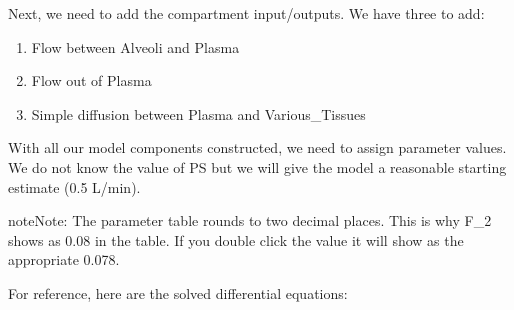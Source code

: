\documentclass[letterpaper,10pt,english]{sphinxmanual}
\begin{document}
\sphinxAtStartPar
Next, we need to add the compartment input/outputs.  We have three to add:
\begin{enumerate}
%
\item {} 
\sphinxAtStartPar
Flow between Alveoli and Plasma

\begin{figure}[htbp]
\centering

\noindent{}
\end{figure}

\item {} 
\sphinxAtStartPar
Flow out of Plasma

\begin{figure}[htbp]
\centering

\noindent{}
\end{figure}

\item {} 
\sphinxAtStartPar
Simple diffusion between Plasma and Various\_Tissues

\begin{figure}[htbp]
\centering

\noindent{}
\end{figure}

\end{enumerate}

\sphinxAtStartPar
With all our model components constructed, we need to assign parameter values.
We do not know the value of PS but we will give the model a reasonable
starting estimate (0.5 L/min).

\begin{figure}[htbp]
\centering

\noindent{}
\end{figure}

\begin{sphinxadmonition}{note}{Note:}
\sphinxAtStartPar
The parameter table rounds to two decimal places.  This is why F\_2
shows as 0.08 in the table. If you double click the value it will
show as the appropriate 0.078.
\end{sphinxadmonition}

\sphinxAtStartPar
For reference, here are the solved differential equations:

\begin{figure}[htbp]
\centering

\noindent{}
\end{figure}
\end{document}
